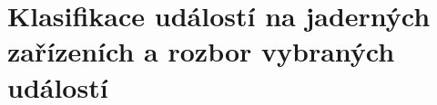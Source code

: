 \section[Klasifikace událostí na jaderných zařízeních]{Klasifikace událostí na jaderných zařízeních a rozbor vybraných událostí}

